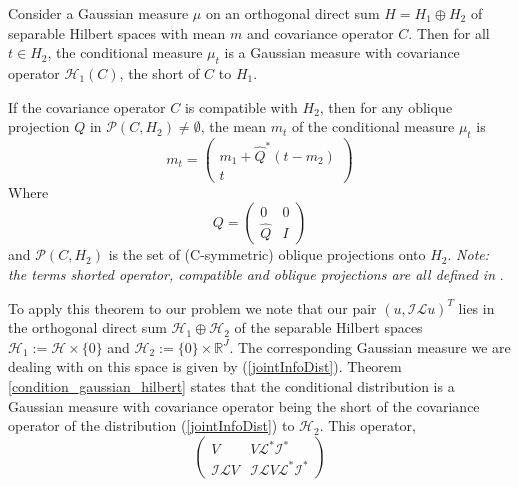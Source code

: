 \begin{theorem}
    \label{condition_gaussian_hilbert}
    Consider a Gaussian measure $\mu$ on an orthogonal direct sum $H=H_{1}\oplus H_{2}$ of separable Hilbert spaces with mean $m$ and covariance operator $C$. Then for all $t\in H_2$, the conditional measure $\mu_{t}$ is a Gaussian measure with covariance operator $\mathcal{H}_{1}(C)$, the short of $C$ to $H_{1}$.

    If the covariance operator $C$ is compatible with $H_2$, then for any oblique projection $Q$ in $\mathcal{P}(C,H_2)\neq\emptyset$, the mean $m_t$ of the conditional measure $\mu_t$ is
    \begin{equation*}
        m_t = \begin{pmatrix}
                m_1 + \hat{Q}^{*}(t-m_2) \\
                t
              \end{pmatrix}
    \end{equation*}
    Where \begin{equation*}
            Q=\begin{pmatrix}
                0 & 0 \\
                \hat{Q} & I
              \end{pmatrix}
          \end{equation*}
   and $\mathcal{P}(C,H_2)$ is the set of (C-symmetric) oblique projections onto $H_2$. \textit{Note: the terms shorted operator, compatible and oblique projections are all defined in} \textcolor{blue}{\cite{owhadi2015conditioning}}.
\end{theorem}
To apply this theorem to our problem we note that our pair $(u,\mathcal{I}\mathcal{L}u)^{T}$ lies in the orthogonal direct sum $\mathcal{H}_{1}\oplus\mathcal{H}_{2}$ of the separable Hilbert spaces $\mathcal{H}_{1}:=\mathcal{H}\times\{0\}$ and $\mathcal{H}_{2}:=\{0\}\times\mathbb{R}^{J}$. The corresponding Gaussian measure we are dealing with on this space is given by (\ref{jointInfoDist}). Theorem \textcolor{blue}{\ref{condition_gaussian_hilbert}} states that the conditional distribution is a Gaussian measure with covariance operator being the short of the covariance operator of the distribution (\ref{jointInfoDist}) to $\mathcal{H}_{2}$. This operator,
\begin{equation*}
    \begin{pmatrix}
        V & V\mathcal{L}^{*}\mathcal{I}^{*} \\
        \mathcal{I}\mathcal{L}V & \mathcal{I}\mathcal{L}V\mathcal{L}^{*}\mathcal{I}^{*}
    \end{pmatrix}
\end{equation*}
